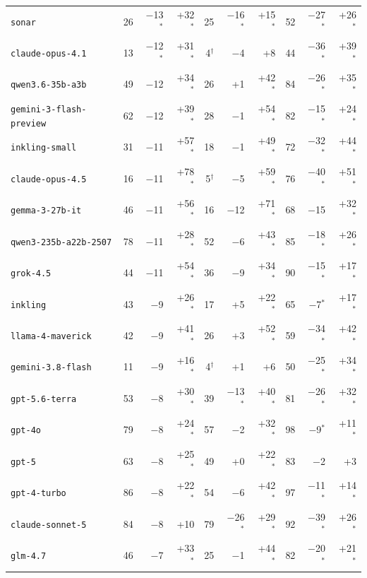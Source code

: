 \begin{tabular}{l rrr rrr rrr}
\texttt{sonar} & 26 & $-$13$^*$ & +32$^*$ & 25 & $-$16$^*$ & +15$^*$ & 52 & $-$27$^*$ & +26$^*$ \\
\texttt{claude-opus-4.1} & 13 & $-$12$^*$ & +31$^*$ & 4$^\dagger$ & $-$4 & +8 & 44 & $-$36$^*$ & +39$^*$ \\
\texttt{qwen3.6-35b-a3b} & 49 & $-$12 & +34$^*$ & 26 & +1 & +42$^*$ & 84 & $-$26$^*$ & +35$^*$ \\
\texttt{gemini-3-flash-preview} & 62 & $-$12 & +39$^*$ & 28 & $-$1 & +54$^*$ & 82 & $-$15$^*$ & +24$^*$ \\
\texttt{inkling-small} & 31 & $-$11 & +57$^*$ & 18 & $-$1 & +49$^*$ & 72 & $-$32$^*$ & +44$^*$ \\
\texttt{claude-opus-4.5} & 16 & $-$11 & +78$^*$ & 5$^\dagger$ & $-$5 & +59$^*$ & 76 & $-$40$^*$ & +51$^*$ \\
\texttt{gemma-3-27b-it} & 46 & $-$11 & +56$^*$ & 16 & $-$12 & +71$^*$ & 68 & $-$15 & +32$^*$ \\
\texttt{qwen3-235b-a22b-2507} & 78 & $-$11 & +28$^*$ & 52 & $-$6 & +43$^*$ & 85 & $-$18$^*$ & +26$^*$ \\
\texttt{grok-4.5} & 44 & $-$11 & +54$^*$ & 36 & $-$9 & +34$^*$ & 90 & $-$15$^*$ & +17$^*$ \\
\texttt{inkling} & 43 & $-$9 & +26$^*$ & 17 & +5 & +22$^*$ & 65 & $-$7$^*$ & +17$^*$ \\
\texttt{llama-4-maverick} & 42 & $-$9 & +41$^*$ & 26 & +3 & +52$^*$ & 59 & $-$34$^*$ & +42$^*$ \\
\texttt{gemini-3.8-flash} & 11 & $-$9 & +16$^*$ & 4$^\dagger$ & +1 & +6 & 50 & $-$25$^*$ & +34$^*$ \\
\texttt{gpt-5.6-terra} & 53 & $-$8 & +30$^*$ & 39 & $-$13$^*$ & +40$^*$ & 81 & $-$26$^*$ & +32$^*$ \\
\texttt{gpt-4o} & 79 & $-$8 & +24$^*$ & 57 & $-$2 & +32$^*$ & 98 & $-$9$^*$ & +11$^*$ \\
\texttt{gpt-5} & 63 & $-$8 & +25$^*$ & 49 & +0 & +22$^*$ & 83 & $-$2 & +3 \\
\texttt{gpt-4-turbo} & 86 & $-$8 & +22$^*$ & 54 & $-$6 & +42$^*$ & 97 & $-$11$^*$ & +14$^*$ \\
\texttt{claude-sonnet-5} & 84 & $-$8 & +10 & 79 & $-$26$^*$ & +29$^*$ & 92 & $-$39$^*$ & +26$^*$ \\
\texttt{glm-4.7} & 46 & $-$7 & +33$^*$ & 25 & $-$1 & +44$^*$ & 82 & $-$20$^*$ & +21$^*$ \\
\bottomrule
\end{tabular}

